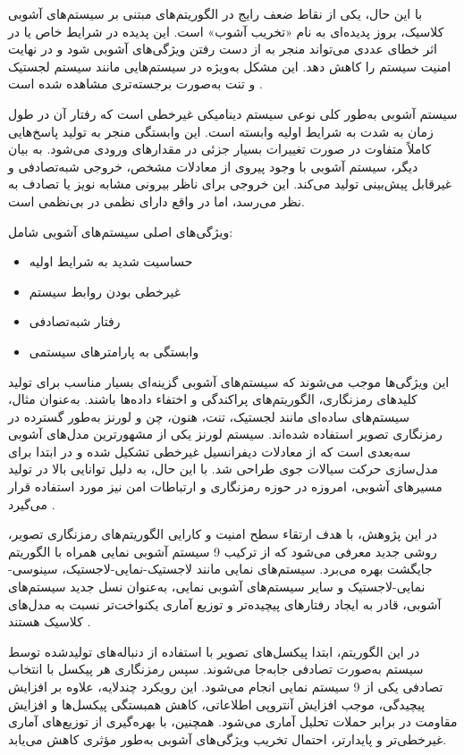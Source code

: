 با این حال، یکی از نقاط ضعف رایج در الگوریتم‌های مبتنی بر سیستم‌های آشوبی کلاسیک، بروز پدیده‌ای به نام «تخریب آشوب»\protect{} است. این پدیده در شرایط خاص یا در اثر خطای عددی می‌تواند منجر به از دست رفتن ویژگی‌های آشوبی شود و در نهایت امنیت سیستم را کاهش دهد. این مشکل به‌ویژه در سیستم‌هایی مانند سیستم لجستیک و تنت به‌صورت برجسته‌تری مشاهده شده است \cite{ref5}.

سیستم آشوبی به‌طور کلی نوعی سیستم دینامیکی غیرخطی است که رفتار آن در طول زمان به شدت به شرایط اولیه وابسته است. این وابستگی منجر به تولید پاسخ‌هایی کاملاً متفاوت در صورت تغییرات بسیار جزئی در مقدارهای ورودی می‌شود. به بیان دیگر، سیستم آشوبی با وجود پیروی از معادلات مشخص، خروجی شبه‌تصادفی و غیرقابل پیش‌بینی تولید می‌کند. این خروجی برای ناظر بیرونی مشابه نویز یا تصادف به نظر می‌رسد، اما در واقع دارای نظمی در بی‌نظمی است.

ویژگی‌های اصلی سیستم‌های آشوبی شامل:
\begin{itemize}
    \item حساسیت شدید به شرایط اولیه
    \item غیرخطی بودن روابط سیستم
    \item رفتار شبه‌تصادفی
    \item وابستگی به پارامترهای سیستمی
\end{itemize}

این ویژگی‌ها موجب می‌شوند که سیستم‌های آشوبی گزینه‌ای بسیار مناسب برای تولید کلیدهای رمزنگاری، الگوریتم‌های پراکندگی و اختفاء داده‌ها باشند. به‌عنوان مثال، سیستم‌های ساده‌ای مانند لجستیک، تنت، هنون، چن و لورنز به‌طور گسترده در رمزنگاری تصویر استفاده شده‌اند. سیستم لورنز یکی از مشهورترین مدل‌های آشوبی سه‌بعدی است که از معادلات دیفرانسیل غیرخطی تشکیل شده و در ابتدا برای مدل‌سازی حرکت سیالات جوی طراحی شد. با این حال، به دلیل توانایی بالا در تولید مسیرهای آشوبی، امروزه در حوزه رمزنگاری و ارتباطات امن نیز مورد استفاده قرار می‌گیرد \cite{ref6}.

در این پژوهش، با هدف ارتقاء سطح امنیت و کارایی الگوریتم‌های رمزنگاری تصویر، روشی جدید معرفی می‌شود که از ترکیب 9 سیستم آشوبی نمایی همراه با الگوریتم جایگشت بهره می‌برد. سیستم‌های نمایی مانند لاجستیک-نمایی-لاجستیک\protect{}، سینوسی-نمایی-لاجستیک\protect{} و سایر سیستم‌های آشوبی نمایی، به‌عنوان نسل جدید سیستم‌های آشوبی، قادر به ایجاد رفتارهای پیچیده‌تر و توزیع آماری یکنواخت‌تر نسبت به مدل‌های کلاسیک هستند \cite{ref4}.

در این الگوریتم، ابتدا پیکسل‌های تصویر با استفاده از دنباله‌های تولیدشده توسط سیستم به‌صورت تصادفی جابه‌جا می‌شوند. سپس رمزنگاری هر پیکسل با انتخاب تصادفی یکی از 9 سیستم نمایی انجام می‌شود. این رویکرد چندلایه، علاوه بر افزایش پیچیدگی، موجب افزایش آنتروپی اطلاعاتی، کاهش همبستگی پیکسل‌ها و افزایش مقاومت در برابر حملات تحلیل آماری می‌شود. همچنین، با بهره‌گیری از توزیع‌های آماری غیرخطی‌تر و پایدارتر، احتمال تخریب ویژگی‌های آشوبی به‌طور مؤثری کاهش می‌یابد.

